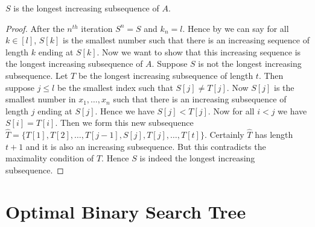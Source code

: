 \begin{Theorem}{}{}
	$S$ is the longest increasing subsequence of $A$.
\end{Theorem}
\begin{proof}
	After the $n^{th}$ iteration $S^n=S$ and $k_n=l$. Hence by  we can say for all $k\in[l]$, $S[k]$ is the smallest number such that there is an increasing sequence of length $k$ ending at $S[k]$. Now we want to show that this increasing sequence is the longest increasing subsequence of $A$. Suppose $S$ is not the longest increasing subsequence. Let $T$ be the longest increasing subsequence of length $t$. Then suppose $j\leq l$ be the smallest index such that $S[j]\neq T[j]$. Now $S[j]$ is the smallest number in $x_1,\dots, x_n$ such that there is an increasing subsequence of length $j$ ending at $S[j]$. Hence we have $S[j]<T[j]$. Now for all $i<j$ we have $S[i]=T[i]$.   Then we form this new subsequence $\hat{T}=\{T[1],T[2],\dots, T[j-1], S[j],T[j],\dots, T[t]\}$. Certainly $\hat{T}$ has length $t+1$ and it is also an increasing subsequence. But this contradicts the maximality condition of $T$. Hence $S$ is indeed the longest increasing subsequence.
\end{proof}

\section{Optimal Binary Search Tree}
\begin{algoprob}
\end{algoprob}

